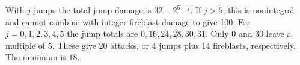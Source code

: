 With $j$ jumps the total jump damage is $32-2^{5-j}$. If $j>5$, this is nonintegral and cannot combine with integer fireblast damage to give 100. For $j=0,1,2,3,4,5$ the jump totals are $0,16,24,28,30,31$. Only 0 and 30 leave a multiple of 5. These give 20 attacks, or 4 jumps plus 14 fireblasts, respectively. The minimum is $\boxed{18}$.

